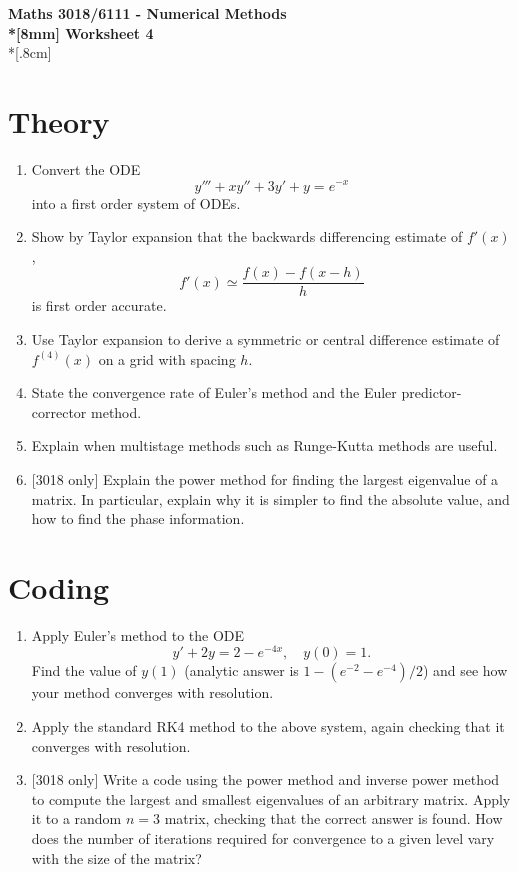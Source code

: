 \documentclass[10pt]{article}
\begin{document}
\thispagestyle{empty}
\begin{center}
\textbf{\Large Maths 3018/6111 - Numerical Methods \\*[8mm]
Worksheet 4}\\*[.8cm]
\end{center}

\section*{Theory}

\begin{enumerate}
\item Convert the ODE
  \begin{equation*}
    y''' + x y'' + 3 y' + y = e^{-x}
  \end{equation*}
  into a first order system of ODEs.
\item Show by Taylor expansion that the backwards differencing
  estimate of $f'(x)$,
  \begin{equation*}
    f'(x) \simeq \frac{f(x) - f(x-h)}{h}
  \end{equation*}
  is first order accurate.
\item Use Taylor expansion to derive a symmetric or central difference
  estimate of $f^{(4)}(x)$ on a grid with spacing $h$.
\item State the convergence rate of Euler's method and the
  Euler predictor-corrector method.
\item Explain when multistage methods such as Runge-Kutta methods are useful.
\item{} [3018 only] Explain the power method for finding the largest
  eigenvalue of a matrix. In particular, explain why it is simpler to
  find the absolute value, and how to find the phase information.
\end{enumerate}

\section*{Coding}

\begin{enumerate}
\item Apply Euler's method to the ODE
  \begin{equation*}
    y' + 2 y = 2 - e^{-4 x}, \quad y(0) = 1.
  \end{equation*}
  Find the value of $y(1)$ (analytic answer is $1 -
  (e^{-2}-e^{-4})/2$) and see how your method converges with
  resolution.
\item Apply the standard RK4 method to the above system, again
  checking that it converges with resolution.
\item {} [3018 only] Write a code using the power method and inverse
  power method to compute the largest and smallest eigenvalues of an
  arbitrary matrix. Apply it to a random $n=3$ matrix, checking that
  the correct answer is found. How does the number of iterations
  required for convergence to a given level vary with the size of the
  matrix?
\end{enumerate}
\end{document}
